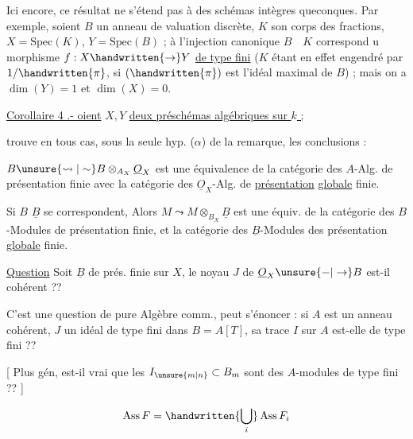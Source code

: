 Ici encore, ce résultat ne s'étend pas à des schémas intègres queconques. Par exemple, soient $B$ un anneau de valuation discrète, $K$ son corps des fractions, $X=\mathrm{Spec}(K)$, $Y=\mathrm{Spec}(B)$ ; à l'injection canonique $B\quad K$ correspond u morphisme $f:X\handwritten{\to}Y$ \uline{de type fini} ($K$ étant en effet engendré par $1/\handwritten{\pi}$, si  $(\handwritten{\pi})$ est l'idéal maximal de $B$) ; mais on a  $\dim(Y)=1$ et $\dim(X)=0$.

\uline{Corollaire 4 .- oient} $X,Y$ \uline{deux préschémas algébriques sur $k$ ; }

\unsure{On|[On|Du} trouve en tous cas, sous la seule hyp. ($\alpha$) de la remarque, les conclusions :

$B\unsure{\leadsto|\sim} B\otimes_{A_X}\underline O_X$ est une équivalence de la catégorie des $A$-Alg. de présentation finie avec la catégorie des $\underline O_X$-Alg. de \uline{présentation} \uline{globale} finie.

Si $B$   $\underline B$ se correspondent, Alors $M\leadsto M\otimes_{B_X}\underline B$ est une équiv. de la catégorie des $B$-Modules de présentation finie, et la catégorie des $\underline B$-Modules des présentation \uline{globale} finie.

\uline{Question} Soit $\underline B$ de  prés. finie sur $X$, le noyau $J$ de $\underline O_X\unsure{-|\to}B$ est-il cohérent ??

C'est une question de pure Algèbre comm., peut s'énoncer : si $A$ est un anneau cohérent,  $J$ un idéal de type fini dans $B=A[T]$, sa trace $I$ sur $A$ est-elle de type fini ??

[ Plus gén, est-il vrai que les $I_{\unsure{m|n}}\subset B_m$ sont des $A$-modules de type fini ?? ]


\[
 \operatorname{Ass}F=\handwritten{\bigcup_i}\operatorname{Ass}F_i
\]

